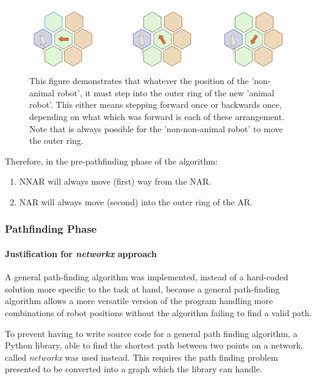 \begin{figure}[H]
    \centering
    \includegraphics[scale = 0.5]{images/move_to_outer_ring.png}
    \caption{This figure demonstrates that whatever the position of the 'non-animal robot', it must step into the outer ring of the new 'animal robot'. This either means stepping forward once or backwards once, depending on what which was forward is each of these arrangement. Note that is always possible for the 'non-non-animal robot' to move the outer ring.}
    \label{fig:nnar_move_to_outer_ring}
\end{figure}
\begin{tcolorbox}
Therefore, in the pre-pathfinding phase of the algorithm:
\begin{enumerate}
    \item NNAR will always move (first) way from the NAR.
    \item NAR will always move (second) into the outer ring of the AR.
\end{enumerate}
\end{tcolorbox}
\subsubsection{Pathfinding Phase}
\label{section:pathfinding}

\paragraph{Justification for \textit{networkx} approach} 

A general path-finding algorithm was implemented, instead of a hard-coded solution more specific to the task at hand, because a general path-finding algorithm allows a more versatile version of the program handling more combinations of robot positions without the algorithm failing to find a valid path.

To prevent having to write source code for a general path finding algorithm, a Python library, able to find the shortest path between two points on a network, called \textit{networkx} \cite{networkx} was used instead. This requires the path finding problem presented to be converted into a graph which the library can handle.


